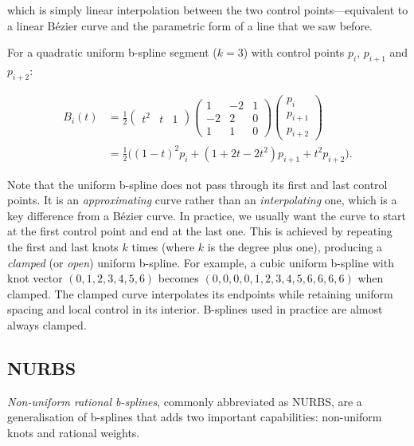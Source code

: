 which is simply linear interpolation between the two control points---equivalent to a linear B\'ezier curve and the parametric form of a line that we saw before.

For a quadratic uniform b-spline segment (\(k=3\)) with control points \(p_i\), \(p_{i+1}\) and \(p_{i+2}\):

\begin{align}
B_i(t) &= \frac{1}{2}\left(\begin{array}{ccc}t^2 & t & 1\end{array}\right)
\left(\begin{array}{ccc}1 & -2 & 1 \\
-2 & 2 & 0 \\
1 & 1 & 0\end{array}\right)
\left(\begin{array}{c}p_i \\ p_{i+1} \\ p_{i+2}\end{array}\right) \nonumber \\
&= \frac{1}{2}\bigl((1-t)^2 p_i + (1+2t-2t^2) p_{i+1} + t^2 p_{i+2}\bigr).
\end{align}

Note that the uniform b-spline does not pass through its first and last control points.
It is an \emph{approximating} curve rather than an \emph{interpolating} one, which is a key difference from a B\'ezier curve.
In practice, we usually want the curve to start at the first control point and end at the last one.
This is achieved by repeating the first and last knots \(k\) times (where \(k\) is the degree plus one), producing a \emph{clamped} (or \emph{open}) uniform b-spline.
For example, a cubic uniform b-spline with knot vector \((0,1,2,3,4,5,6)\) becomes \((0,0,0,0,1,2,3,4,5,6,6,6,6)\) when clamped.
The clamped curve interpolates its endpoints while retaining uniform spacing and local control in its interior.
B-splines used in practice are almost always clamped.

\subsection{NURBS}

\emph{Non-uniform rational b-splines}, commonly abbreviated as NURBS, are a generalisation of b-splines that adds two important capabilities: non-uniform knots and rational weights.

